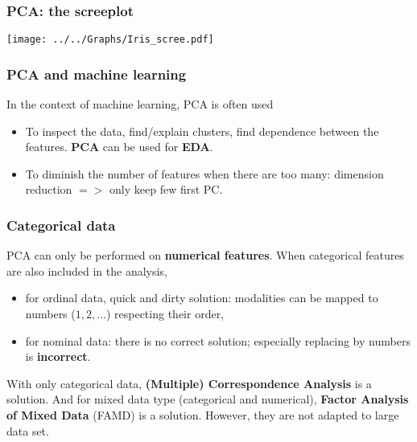 \begin{frame}
\frametitle{PCA: the screeplot}
\begin{center}
\texttt{[image: ../../Graphs/Iris\_scree.pdf]}
\end{center}
\end{frame}
\begin{frame}
\frametitle{PCA and machine learning}
In the context of machine learning, PCA is often used 
\begin{itemize}
\item To inspect the data, find/explain clusters, find dependence between the features. {\bf PCA} can be used for {\bf EDA}.
\item To diminish the number of features when there are too many: dimension reduction $=>$ only keep few first PC.
\end{itemize}
\end{frame}
\begin{frame}
\frametitle{Categorical data}
PCA can only be performed on {\bf numerical features}. When categorical features are also included in the analysis,
\begin{itemize}
\item for ordinal data, quick and dirty solution: modalities can be mapped to numbers ($1,2,\ldots$) respecting their order,
\item for nominal data: there is no correct solution; especially replacing by numbers is {\bf incorrect}.
\end{itemize}
With only categorical data, {\bf (Multiple) Correspondence Analysis} is a solution. And for mixed data type (categorical and numerical), {\bf Factor Analysis of Mixed Data} (FAMD) is a solution. However, they are not adapted to large data set.
\end{frame}
